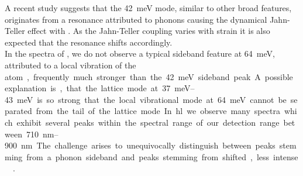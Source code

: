 		A recent study \cite{Londero2016} suggests that the \SI{42}{meV} mode, similar to other broad \psb features, originates from a resonance attributed to phonons causing the dynamical Jahn-Teller effect with \sivs \cite{Fu2009}.
		As the Jahn-Teller coupling varies with strain it is also expected that the resonance shifts accordingly.
		\\
		In the spectra of \vl, we do not observe a typical \siv sideband feature at \SI{64}{meV}, attributed to a local vibration of the \si atom, frequently much stronger than the  \SI{42}{meV} sideband peak.
		A possible explanation is, that the lattice mode at \SIrange{37}{43}{meV} is so strong that the local vibrational mode at \SI{64}{meV} cannot be separated from the tail of the lattice mode.
		In \hl we observe many spectra which exhibit several peaks within the spectral range of our detection range between \SIrange{710}{900}{nm}.
		The challenge arises to unequivocally distinguish between peaks stemming from a phonon sideband and peaks stemming from shifted, less intense \siv \ZPLs.

